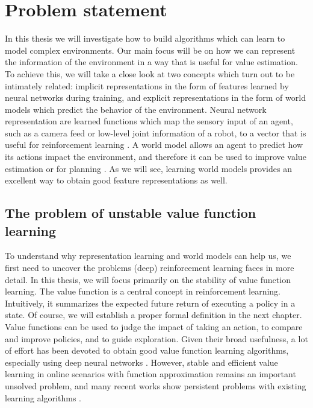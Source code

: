 \section{Problem statement}
In this thesis we will investigate how to build algorithms which can learn to model complex environments.
Our main focus will be on how we can represent the information of the environment in a way that is useful for value estimation.
To achieve this, we will take a close look at two concepts which turn out to be intimately related: implicit representations in the form of features learned by neural networks during training, and explicit representations in the form of world models which predict the behavior of the environment.
Neural network representation are learned functions which map the sensory input of an agent, such as a camera feed or low-level joint information of a robot, to a vector that is useful for reinforcement learning \parencite{ferns2004metrics,jaderberg2017reinforcement,abel2020thesis,le2021metrics}.
A world model allows an agent to predict how its actions impact the environment, and therefore it can be used to improve value estimation or for planning \parencite{dyna,mbpo,hafner2020dream,schrittwieser2020mastering}. 
As we will see, learning world models provides an excellent way to obtain good feature representations as well.

\subsection{The problem of unstable value function learning}

To understand why representation learning and world models can help us, we first need to uncover the problems (deep) reinforcement learning faces in more detail.
In this thesis, we will focus primarily on the stability of value function learning.
The value function is a central concept in reinforcement learning.
Intuitively, it summarizes the expected future return of executing a policy in a state.
Of course, we will establish a proper formal definition in the next chapter.
Value functions can be used to judge the impact of taking an action, to compare and improve policies, and to guide exploration.
Given their broad usefulness, a lot of effort has been devoted to obtain good value function learning algorithms, especially using deep neural networks \parencite{mnih2013playing,hasselt2010double,hasselt2016deep,fujimoto2018addressing,haarnoja2018sac}.
However, stable and efficient value learning in online scenarios with function approximation remains an important unsolved problem, and many recent works show persistent problems with existing learning algorithms \parencite{kumar2021implicit,nikishin2022primacy,hussing2024dissecting}.

